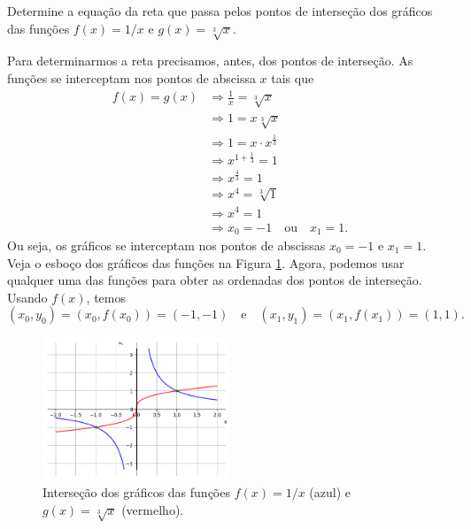 \begin{exeresol}\label{exeresol:funpot_intersep}
  Determine a equação da reta que passa pelos pontos de interseção dos gráficos das funções $f(x) = 1/x$ e $g(x) = \sqrt[3]{x}$.
\end{exeresol}
\begin{resol}
  Para determinarmos a reta precisamos, antes, dos pontos de interseção. As funções se interceptam nos pontos de abscissa $x$ tais que
  \begin{align}
    f(x) = g(x) &\Rightarrow \frac{1}{x} = \sqrt[3]{x}\\
                &\Rightarrow 1 = x\sqrt[3]{x}\\
                &\Rightarrow 1 = x\cdot x^{\frac{1}{3}}\\
                &\Rightarrow x^{1+\frac{1}{3}} = 1\\
                &\Rightarrow x^{\frac{4}{3}} = 1\\
                &\Rightarrow x^4 = \sqrt[3]{1}\\
                &\Rightarrow x^4 = 1\\
                &\Rightarrow x_0 = -1\quad\text{ou}\quad x_1=1.
  \end{align}
  Ou seja, os gráficos se interceptam nos pontos de abscissas $x_0 = -1$ e $x_1 = 1$. Veja o esboço dos gráficos das funções na Figura \ref{fig:exeresol_funpot_intersep}. Agora, podemos usar qualquer uma das funções para obter as ordenadas dos pontos de interseção. Usando $f(x)$, temos
  \begin{equation}
    (x_0, y_0) = (x_0, f(x_0)) = (-1, -1)\quad\text{e}\quad (x_1, y_1) = (x_1, f(x_1)) = (1, 1).
  \end{equation}

  \begin{figure}[H]
    \centering
    \includegraphics[width=0.5\textwidth]{./cap_funcao/dados/fig_exeresol_funpot_intersep/fig_exeresol_funpot_intersep}
    \caption{Interseção dos gráficos das funções $f(x) = 1/x$ (azul) e $g(x) = \sqrt[3]{x}$ (vermelho).}
    \label{fig:exeresol_funpot_intersep}
  \end{figure}


\end{resol}
